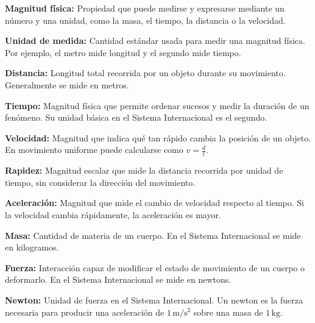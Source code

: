 \documentclass[12pt,final]{report}
\theoremstyle{plain}
\theoremstyle{definition}
\begin{document}
\vspace{0.5em}

\textbf{Magnitud física:} Propiedad que puede medirse y expresarse mediante un número y una unidad, como la masa, el tiempo, la distancia o la velocidad.

\vspace{0.5em}

\textbf{Unidad de medida:} Cantidad estándar usada para medir una magnitud física. Por ejemplo, el metro mide longitud y el segundo mide tiempo.

\vspace{0.5em}

\textbf{Distancia:} Longitud total recorrida por un objeto durante su movimiento. Generalmente se mide en metros.

\vspace{0.5em}

\textbf{Tiempo:} Magnitud física que permite ordenar sucesos y medir la duración de un fenómeno. Su unidad básica en el Sistema Internacional es el segundo.

\vspace{0.5em}

\textbf{Velocidad:} Magnitud que indica qué tan rápido cambia la posición de un objeto. En movimiento uniforme puede calcularse como $v=\frac{d}{t}$.

\vspace{0.5em}

\textbf{Rapidez:} Magnitud escalar que mide la distancia recorrida por unidad de tiempo, sin considerar la dirección del movimiento.

\vspace{0.5em}

\textbf{Aceleración:} Magnitud que mide el cambio de velocidad respecto al tiempo. Si la velocidad cambia rápidamente, la aceleración es mayor.

\vspace{0.5em}

\textbf{Masa:} Cantidad de materia de un cuerpo. En el Sistema Internacional se mide en kilogramos.

\vspace{0.5em}

\textbf{Fuerza:} Interacción capaz de modificar el estado de movimiento de un cuerpo o deformarlo. En el Sistema Internacional se mide en newtons.

\vspace{0.5em}

\textbf{Newton:} Unidad de fuerza en el Sistema Internacional. Un newton es la fuerza necesaria para producir una aceleración de $1\,\mathrm{m/s^2}$ sobre una masa de $1\,\mathrm{kg}$.
\end{document}
